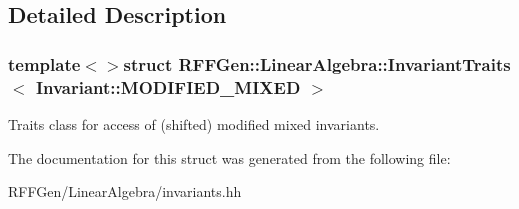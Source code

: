 \subsection{Detailed Description}
\subsubsection*{template$<$$>$struct R\-F\-F\-Gen\-::\-Linear\-Algebra\-::\-Invariant\-Traits$<$ Invariant\-::\-M\-O\-D\-I\-F\-I\-E\-D\-\_\-\-M\-I\-X\-E\-D $>$}

Traits class for access of (shifted) modified mixed invariants. 

The documentation for this struct was generated from the following file\-:\begin{DoxyCompactItemize}
\item 
R\-F\-F\-Gen/\-Linear\-Algebra/invariants.\-hh\end{DoxyCompactItemize}
